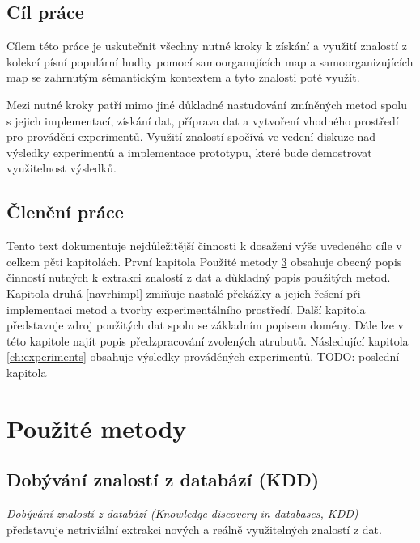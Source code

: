 \documentclass[thesis=M,czech]{FITthesis}[2012/06/26]
\begin{document}
\begin{introduction}
	
	\section{Cíl práce}
	Cílem této práce je uskutečnit všechny nutné kroky k získání a využití znalostí z kolekcí písní populární hudby pomocí samoorganujících map a samoorganizujících map se zahrnutým sémantickým kontextem a tyto znalosti poté využít.
	
Mezi nutné kroky patří mimo jiné důkladné nastudování zmíněných metod spolu s jejich implementací, získání dat, příprava dat a vytvoření vhodného prostředí pro provádění experimentů. Využití znalostí spočívá ve vedení diskuze nad výsledky experimentů a implementace prototypu, které bude demostrovat využitelnost výsledků.




	\section{Členění práce}
	Tento text dokumentuje nejdůležitější činnosti k dosažení výše uvedeného cíle v celkem pěti kapitolách. První kapitola Použité metody \ref{poumetod} obsahuje obecný popis činností nutných k extrakci znalostí z dat a důkladný popis použitých metod. Kapitola druhá \ref{navrhimpl} zmiňuje nastalé překážky a jejich řešení při implementaci metod a tvorby experimentálního prostředí. Další kapitola \label{ch:empl_prepro} představuje zdroj použitých dat spolu se základním popisem domény. Dále lze v této kapitole najít popis předzpracování zvolených atrubutů. Následující kapitola \ref{ch:experiments} obsahuje výsledky provádéných experimentů.  TODO: poslední kapitola
	

	
	
\end{introduction}

\chapter{Použité metody}\label{poumetod}
\section{Dobývání znalostí z databází (KDD)}
\textit{Dobývání znalostí z databází (Knowledge discovery in databases, KDD)} představuje netriviální extrakci nových a reálně využitelných znalostí z dat\cite{kddb}. 
\end{document}
